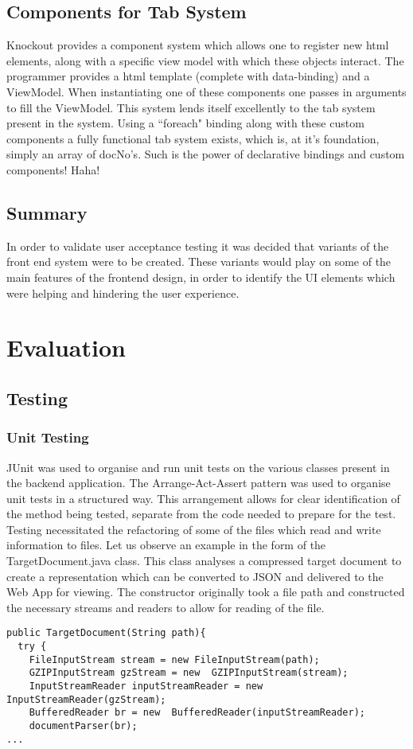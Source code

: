 \documentclass{l4proj}
\begin{document}
\section{Components for Tab System}
Knockout provides a component system which allows one to register new html elements, along with a specific view model with which these objects interact. The programmer provides a html template (complete with data-binding) and a ViewModel. When instantiating one of these components one passes in arguments to fill the ViewModel.
This system lends itself excellently to the tab system present in the system. Using a ``foreach" binding along with these custom components a fully functional tab system exists, which is, at it's foundation, simply an array of docNo's. Such is the power of declarative bindings and custom components! Haha!

\section{Summary}
In order to validate user acceptance testing it was decided that variants of the front end system were to be created. These variants would play on some of the main features of the frontend design, in order to identify the UI elements which were helping and hindering the user experience.

\chapter{Evaluation}
\section{Testing}
\subsection{Unit Testing}
JUnit was used to organise and run unit tests on the various classes present in the backend application.
The Arrange-Act-Assert pattern was used to organise unit tests in a structured way. This arrangement allows for clear identification of the method being tested, separate from the code needed to prepare for the test.
Testing necessitated the refactoring of some of the files which read and write information to files. Let us observe an example in the form of the TargetDocument.java class. This class analyses a compressed target document to create a representation which can be converted to JSON and delivered to the Web App for viewing.
The constructor originally took a file path and constructed the necessary streams and readers to allow for reading of the file.
\begin{verbatim}
public TargetDocument(String path){
  try {
    FileInputStream stream = new FileInputStream(path);
    GZIPInputStream gzStream = new  GZIPInputStream(stream);
    InputStreamReader inputStreamReader = new  InputStreamReader(gzStream);
    BufferedReader br = new  BufferedReader(inputStreamReader);
    documentParser(br);
...
\end{verbatim}
\end{document}
